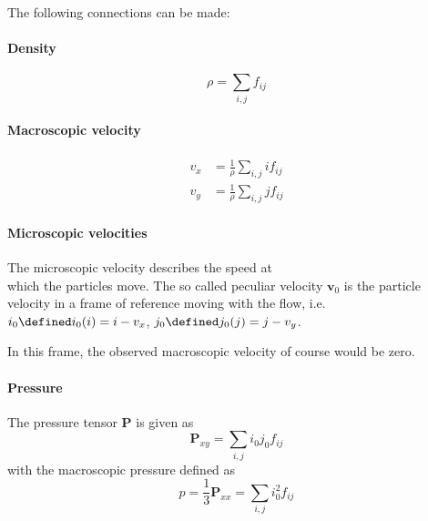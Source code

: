 
The following connections can be made:
\paragraph{Density}
\label{par:Density}
\begin{equation}
  \rho = \sum_{i,j} f_{ij}
\end{equation}

\paragraph{Macroscopic velocity}
\label{par:Macroscopic velocity}
\begin{equation}
  \begin{aligned}
    v_x & = \frac{1}{\rho}\sum_{i,j} i f_{ij} \\
    v_y & = \frac{1}{\rho}\sum_{i,j} j f_{ij}
  \end{aligned}
\end{equation}

\paragraph{Microscopic velocities}
\label{par:Microscopic velocities}

The microscopic velocity describes the speed at \\which the particles move. The so called  peculiar velocity $\mathbf{v}_0$ is the particle velocity in a frame of reference moving with the flow, i.e. $i_0 \defined i_0(i) = i-v_x$, $j_0 \defined j_0(j) = j-v_y$.

In this frame, the observed macroscopic velocity of course would be zero.

\paragraph{Pressure}
\label{par:Pressure}
The pressure tensor $\mathbf{P}$ is given as
\begin{equation}
  \mathbf{P}_{xy} = \sum_{i,j} i_0 j_0 f_{ij}
\end{equation}
with the macroscopic pressure defined as
\begin{equation}
  \label{eq:pressure}
  p = \frac{1}{3}\mathbf{P}_{xx} = \sum_{i,j} i_0^2 f_{ij}
\end{equation}
